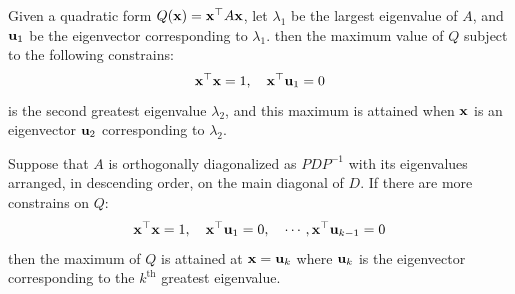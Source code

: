     \begin{Thm}
        Given a quadratic form $Q(\mathbf{x}) = \mathbf{x}^{\top}A\mathbf{x}$, let $\lambda_1$ be the largest eigenvalue of $A$, and $\mathbf{u}_1$ be the eigenvector corresponding to $\lambda_1$. then the maximum value of $Q$ subject to the following constrains:
        \begin{equation*}
            \mathbf{x}^{\top}\mathbf{x} = 1,\quad \mathbf{x}^{\top}\mathbf{u}_1 = 0
        \end{equation*} is the second greatest eigenvalue $\lambda_2$, and this maximum is attained when $\mathbf{x}$ is an eigenvector $\mathbf{u}_2$ corresponding to $\lambda_2$.
        \begin{Rem}
            Suppose that $A$ is orthogonally diagonalized as $PDP^{-1}$ with its eigenvalues arranged, in descending order, on the main diagonal of $D$. 
            If there are more constrains on $Q$:
            \begin{equation*}
                \mathbf{x}^{\top}\mathbf{x} = 1,\quad \mathbf{x}^{\top}\mathbf{u}_1 = 0,\quad \cdots, \mathbf{x}^{\top}\mathbf{u}_{k - 1} = 0
            \end{equation*}
            then the maximum of $Q$ is attained at $\mathbf{x} = \mathbf{u}_k$ where $\mathbf{u}_k$ is the eigenvector corresponding to the $k^{\text{th}}$ greatest eigenvalue.
        \end{Rem}
    \end{Thm}
